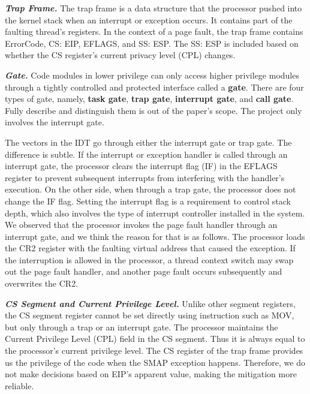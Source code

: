 \textbf{\textit{Trap Frame.}}  The trap frame is a data structure that the processor pushed into the kernel stack when an interrupt or exception occurs. It contains part of the faulting thread's registers. In the context of a page fault, the trap frame contains ErrorCode, CS: EIP, EFLAGS, and SS: ESP. The SS: ESP is included based on whether the CS register's current privacy level (CPL) changes.



\textbf{\textit{Gate.}} Code modules in lower privilege can only access higher privilege modules through a tightly controlled and protected interface called a \textbf{gate}.  There are four types of gate, namely, \textbf{task gate}, \textbf{trap gate}, \textbf{interrupt gate}, and \textbf{call gate}. Fully describe and distinguish them is out of the paper's scope. The project only involves the interrupt gate.

The vectors in the IDT go through either the interrupt gate or trap gate. The difference is subtle. If the interrupt or exception handler is called through an interrupt gate, the processor clears the interrupt flag (IF) in the EFLAGS register to prevent subsequent interrupts from interfering with the handler's execution.  On the other side, when through a trap gate, the processor does not change the IF flag. Setting the interrupt flag is a requirement to control stack depth, which also involves the type of interrupt controller installed in the system. We observed that the processor invokes the page fault handler through an interrupt gate, and we think the reason for that is as follows. The processor loads the CR2 register with the faulting virtual address that caused the exception. If the interruption is allowed in the processor, a thread context switch may swap out the page fault handler, and another page fault occurs subsequently and overwrites the CR2.



\textbf{\textit{CS Segment and Current Privilege Level.}} Unlike other segment registers, the CS segment register cannot be set directly using instruction such as MOV,  but only through a trap or an interrupt gate.  The processor maintains the Current Privilege Level (CPL) field in the CS segment. Thus it is always equal to the processor's current privilege level. The CS register of the trap frame provides us the privilege of the code when the SMAP exception happens. Therefore, we do not make decisions based on EIP's apparent value, making the mitigation more reliable.


